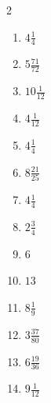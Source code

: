 \documentclass[12pt]{article}
\begin{document}
\begin{multicols}{2}
\begin{enumerate}
\item $ 4 \frac{1}{4} $
\item $ 5 \frac{71}{72} $
\item $ 10 \frac{1}{12} $
\item $ 4 \frac{1}{12} $
\item $ 4 \frac{1}{4} $
\item $ 8 \frac{21}{25} $
\item $ 4 \frac{1}{4} $
\item $ 2 \frac{3}{4} $
\item $ 6 $
\item $ 13 $
\item $ 8 \frac{1}{9} $
\item $ 3 \frac{37}{80} $
\item $ 6 \frac{19}{36} $
\item $ 9 \frac{1}{12} $
\end{enumerate}\end{multicols}\newpage
\end{document}
